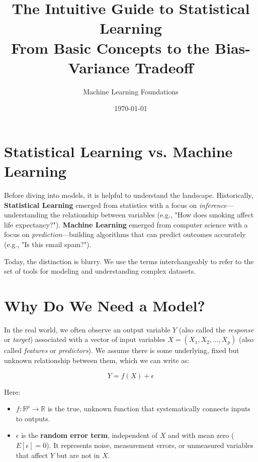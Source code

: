 \documentclass[11pt, a4paper]{article}
\title{\textbf{The Intuitive Guide to Statistical Learning}\\ \large From Basic Concepts to the Bias-Variance Tradeoff}
\author{Machine Learning Foundations}
\date{\today}
\begin{document}
\maketitle
\tableofcontents
\newpage

\section{Statistical Learning vs. Machine Learning}

Before diving into models, it is helpful to understand the landscape. Historically, \textbf{Statistical Learning} emerged from statistics with a focus on \textit{inference}—understanding the relationship between variables (e.g., "How does smoking affect life expectancy?"). \textbf{Machine Learning} emerged from computer science with a focus on \textit{prediction}—building algorithms that can predict outcomes accurately (e.g., "Is this email spam?").

Today, the distinction is blurry. We use the terms interchangeably to refer to the set of tools for modeling and understanding complex datasets.

\section{Why Do We Need a Model?}

In the real world, we often observe an output variable $Y$ (also called the \textit{response} or \textit{target}) associated with a vector of input variables $X = (X_1, X_2, \dots, X_p)$ (also called \textit{features} or \textit{predictors}). We assume there is some underlying, fixed but unknown relationship between them, which we can write as:

\begin{equation}
    Y = f(X) + \epsilon
\end{equation}

Here:
\begin{itemize}
    \item $f: \mathbb{R}^p \to \mathbb{R}$ is the true, unknown function that systematically connects inputs to outputs.
    \item $\epsilon$ is the \textbf{random error term}, independent of $X$ and with mean zero ($E[\epsilon] = 0$). It represents noise, measurement errors, or unmeasured variables that affect $Y$ but are not in $X$.
\end{itemize}
\end{document}
